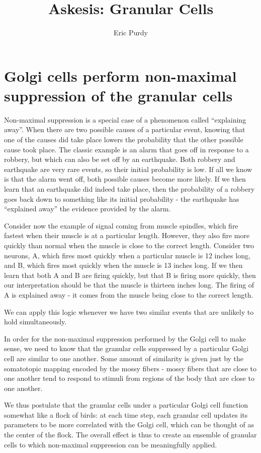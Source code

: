 \documentclass{article}
\title{Askesis: Granular Cells} \author{Eric Purdy}
\theoremstyle{definition}
\begin{document}
\maketitle


\section{Golgi cells perform non-maximal suppression of the granular cells}

Non-maximal suppression is a special case of a phenomenon called
``explaining away''. When there are two possible causes of a
particular event, knowing that one of the causes did take place lowers
the probability that the other possible cause took place. The classic
example is an alarm that goes off in response to a robbery, but which
can also be set off by an earthquake. Both robbery and earthquake are
very rare events, so their initial probability is low. If all we know
is that the alarm went off, both possible causes become more
likely. If we then learn that an earthquake did indeed take place,
then the probability of a robbery goes back down to something like its
initial probability - the earthquake has ``explained away'' the
evidence provided by the alarm.

Consider now the example of signal coming from muscle spindles, which
fire fastest when their muscle is at a particular length. However,
they also fire more quickly than normal when the muscle is close to
the correct length. Consider two neurons, A, which fires most quickly
when a particular muscle is 12 inches long, and B, which fires most
quickly when the muscle is 13 inches long. If we then learn that both
A and B are firing quickly, but that B is firing more quickly, then
our interpretation should be that the muscle is thirteen inches
long. The firing of A is explained away - it comes from the muscle
being close to the correct length.

We can apply this logic whenever we have two similar events that are
unlikely to hold simultaneously.

In order for the non-maximal suppression performed by the Golgi cell
to make sense, we need to know that the granular cells suppressed by a
particular Golgi cell are similar to one another. Some amount of
similarity is given just by the somatotopic mapping encoded by the
mossy fibers - mossy fibers that are close to one another tend to
respond to stimuli from regions of the body that are close to one
another.

We thus postulate that the granular cells under a particular Golgi
cell function somewhat like a flock of birds: at each time step, each
granular cell updates its parameters to be more correlated with the
Golgi cell, which can be thought of as the center of the flock. The
overall effect is thus to create an ensemble of granular cells to
which non-maximal suppression can be meaningfully applied.
\end{document}

